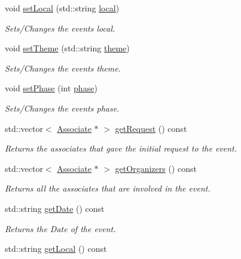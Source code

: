 \begin{DoxyCompactItemize}
void \mbox{\hyperlink{classEvent_ab4e1fd7cd5e56f58d3cd36a69e475054}{set\+Local}} (std\+::string \mbox{\hyperlink{classEvent_a3d1f28a3bde9ab718d5b0003f8ab5129}{local}})
\begin{DoxyCompactList}\small\item\em Sets/\+Changes the event\textquotesingle{}s local. \end{DoxyCompactList}\item 
void \mbox{\hyperlink{classEvent_abdd2c869f0231002c2a16813923586fb}{set\+Theme}} (std\+::string \mbox{\hyperlink{classEvent_aa9cc4378d5cecaadc8e6de92b313e6f8}{theme}})
\begin{DoxyCompactList}\small\item\em Sets/\+Changes the event\textquotesingle{}s theme. \end{DoxyCompactList}\item 
void \mbox{\hyperlink{classEvent_ab630975b378bad5230ae550b3e9ffc9a}{set\+Phase}} (int \mbox{\hyperlink{classEvent_a4059db56458a92ddb5bd1d1443631b02}{phase}})
\begin{DoxyCompactList}\small\item\em Sets/\+Changes the event\textquotesingle{}s phase. \end{DoxyCompactList}\item 
std\+::vector$<$ \mbox{\hyperlink{classAssociate}{Associate}} $\ast$ $>$ \mbox{\hyperlink{classEvent_a424a2862591a8437b0d18366c7aee247}{get\+Request}} () const
\begin{DoxyCompactList}\small\item\em Returns the associates that gave the initial request to the event. \end{DoxyCompactList}\item 
std\+::vector$<$ \mbox{\hyperlink{classAssociate}{Associate}} $\ast$ $>$ \mbox{\hyperlink{classEvent_a7e09dd7707422e30104727a069573e88}{get\+Organizers}} () const
\begin{DoxyCompactList}\small\item\em Returns all the associates that are involved in the event. \end{DoxyCompactList}\item 
std\+::string \mbox{\hyperlink{classEvent_a42abbf59c83e3fa6c964463a5e65ea00}{get\+Date}} () const
\begin{DoxyCompactList}\small\item\em Returns the Date of the event. \end{DoxyCompactList}\item 
std\+::string \mbox{\hyperlink{classEvent_aa2b3aee8416f68b890083a09eecfea8b}{get\+Local}} () const

\end{DoxyCompactItemize}

